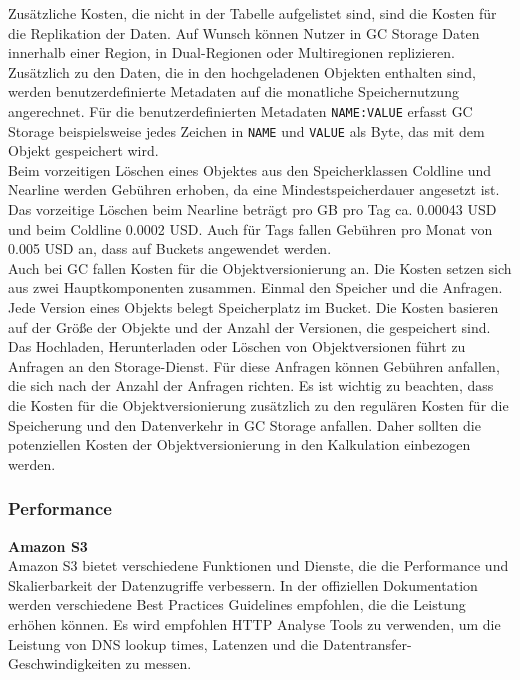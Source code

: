 Zusätzliche Kosten, die nicht in der Tabelle aufgelistet sind, sind die Kosten für die Replikation der Daten. Auf Wunsch können Nutzer in GC Storage Daten innerhalb einer Region, in Dual-Regionen oder Multiregionen replizieren. Zusätzlich zu den Daten, die in den hochgeladenen Objekten enthalten sind, werden benutzerdefinierte Metadaten auf die monatliche Speichernutzung angerechnet. Für die benutzerdefinierten Metadaten \verb|NAME:VALUE| erfasst GC Storage beispielsweise jedes Zeichen in \verb|NAME| und \verb|VALUE| als Byte, das mit dem Objekt gespeichert wird.\\

Beim vorzeitigen Löschen eines Objektes aus den Speicherklassen Coldline und Nearline werden Gebühren erhoben, da eine Mindestspeicherdauer angesetzt ist. Das vorzeitige Löschen beim Nearline beträgt pro GB pro Tag ca. 0.00043 USD und beim Coldline 0.0002 USD. Auch für Tags fallen Gebühren pro Monat von 0.005 USD an, dass auf Buckets angewendet werden.\\

Auch bei GC fallen Kosten für die Objektversionierung an. Die Kosten setzen sich aus zwei Hauptkomponenten zusammen. Einmal den Speicher und die Anfragen. Jede Version eines Objekts belegt Speicherplatz im Bucket. Die Kosten basieren auf der Größe der Objekte und der Anzahl der Versionen, die gespeichert sind. Das Hochladen, Herunterladen oder Löschen von Objektversionen führt zu Anfragen an den Storage-Dienst. Für diese Anfragen können Gebühren anfallen, die sich nach der Anzahl der Anfragen richten. Es ist wichtig zu beachten, dass die Kosten für die Objektversionierung zusätzlich zu den regulären Kosten für die Speicherung und den Datenverkehr in GC Storage anfallen. Daher sollten die potenziellen Kosten der Objektversionierung in den Kalkulation einbezogen werden.

\newpage

\subsubsection{Performance}

\textbf{Amazon S3}\\

Amazon S3 bietet verschiedene Funktionen und Dienste, die die Performance und Skalierbarkeit der Datenzugriffe verbessern. In der offiziellen Dokumentation \cite{performance-guide} werden verschiedene Best Practices Guidelines empfohlen, die die Leistung erhöhen können. Es wird empfohlen HTTP Analyse Tools zu verwenden, um die Leistung von DNS lookup times, Latenzen und die Datentransfer-Geschwindigkeiten zu messen.\\


